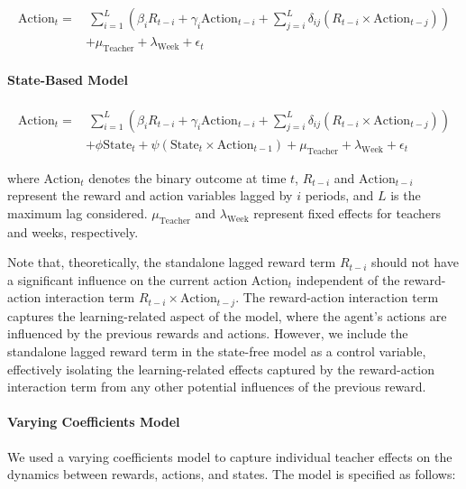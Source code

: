 \documentclass[
  number,
  preprint,
  3p,
  onecolumn]{elsarticle}
\let\oldparagraph\paragraph
\renewcommand{\paragraph}[1]{\oldparagraph{#1}\mbox{}}
\begin{document}
\begin{align*}
\text{Action}_t =& \ \sum_{i=1}^{L} \left( \beta_{i} R_{t-i} + \gamma_i \text{Action}_{t-i} + \sum_{j=i}^{L} \delta_{ij} (R_{t-i} \times \text{Action}_{t-j}) \right) \\
& + \mu_{\text{Teacher}} + \lambda_{\text{Week}} + \epsilon_t 
\end{align*}

\paragraph{State-Based Model}\label{state-based-model}

\begin{align*}
\text{Action}_t =& \ \sum_{i=1}^{L} \left( \beta_{i} R_{t-i} + \gamma_i \text{Action}_{t-i} + \sum_{j=i}^{L} \delta_{ij} (R_{t-i} \times \text{Action}_{t-j}) \right) \\
& + \phi \text{State}_{t} + \psi (\text{State}_{t} \times \text{Action}_{t-1}) + \mu_{\text{Teacher}} + \lambda_{\text{Week}} + \epsilon_t
\end{align*}

where \(\text{Action}_t\) denotes the binary outcome at time \(t\),
\(R_{t-i}\) and \(\text{Action}_{t-i}\) represent the reward and action
variables lagged by \(i\) periods, and \(L\) is the maximum lag
considered. \(\mu_{\text{Teacher}}\) and \(\lambda_{\text{Week}}\)
represent fixed effects for teachers and weeks, respectively.

Note that, theoretically, the standalone lagged reward term \(R_{ t-i}\)
should not have a significant influence on the current action
\(\text{Action}_t\) independent of the reward-action interaction term
\(R_{t-i} \times \text{Action}_{t-j}\). The reward-action interaction
term captures the learning-related aspect of the model, where the
agent's actions are influenced by the previous rewards and actions.
However, we include the standalone lagged reward term in the state-free
model as a control variable, effectively isolating the learning-related
effects captured by the reward-action interaction term from any other
potential influences of the previous reward.

\paragraph{Varying Coefficients Model}\label{varying-coefficients-model}

We used a varying coefficients model to capture individual teacher
effects on the dynamics between rewards, actions, and states. The model
is specified as follows:
\end{document}
